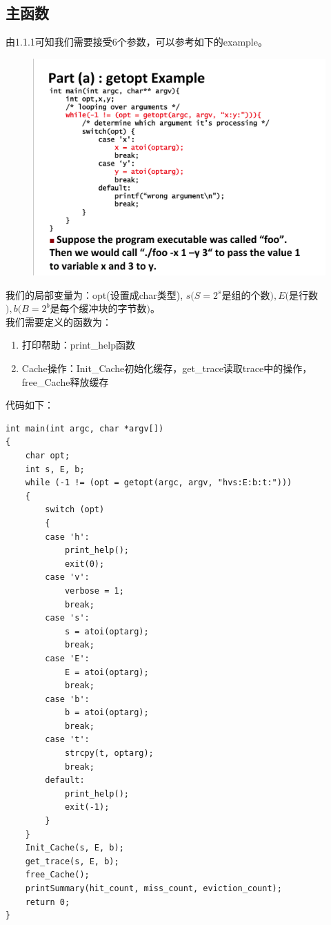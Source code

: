 \documentclass[12pt, a4paper, oneside]{ctexart}
\begin{document}
\subsection{主函数}
\noindent
由1.1.1可知我们需要接受6个参数，可以参考如下的example。\\
\begin{figure}[htbp]
    \centering
    \includegraphics[scale=0.2]{image/2-1.png}
\end{figure}
我们的局部变量为：opt(设置成char类型), $s(S = 2^s $是组的个数$), E($是行数$), b(B = 2^b $是每个缓冲块的字节数$)$。\\
我们需要定义的函数为：
\begin{enumerate}
    \item 打印帮助：print\_help函数
    \item Cache操作：Init\_Cache初始化缓存，get\_trace读取trace中的操作，free\_Cache释放缓存
\end{enumerate}
代码如下：
\begin{lstlisting}
int main(int argc, char *argv[])
{
    char opt;
    int s, E, b;
    while (-1 != (opt = getopt(argc, argv, "hvs:E:b:t:")))
    {
        switch (opt)
        {
        case 'h':
            print_help();
            exit(0);
        case 'v':
            verbose = 1;
            break;
        case 's':
            s = atoi(optarg);
            break;
        case 'E':
            E = atoi(optarg);
            break;
        case 'b':
            b = atoi(optarg);
            break;
        case 't':
            strcpy(t, optarg);
            break;
        default:
            print_help();
            exit(-1);
        }
    }
    Init_Cache(s, E, b);
    get_trace(s, E, b);
    free_Cache();
    printSummary(hit_count, miss_count, eviction_count);
    return 0;
}
\end{lstlisting}
\end{document}
